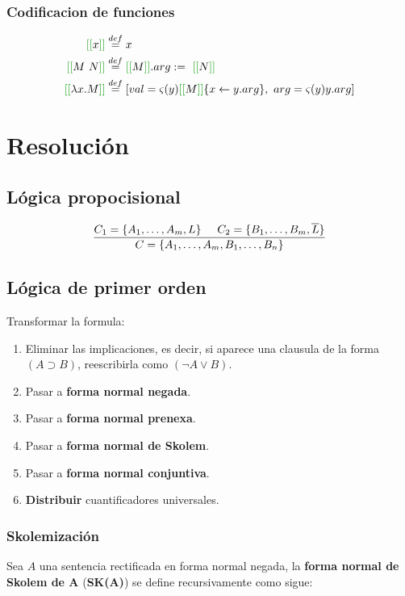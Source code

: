 \documentclass[10pt,a4paper]{article}
\begin{document}
\subsubsection{Codificacion de funciones}
\begin{align*}
\OORep{x} &\equalDef x\\
\OORep{M~N} &\equalDef \OORep{M}.arg :=~\OORep{N}\\
\OORep{\lambdaAbsI{x}{M}} &\equalDef 
[\OOAtributo{val}{y}{\OORep{M}\{x\leftarrow y.arg\}},~\OOAtributo{arg}{y}{y.arg}]\\
\end{align*}


\newpage
\section{Resolución}
\subsection{Lógica propocisional}
$$\frac{C_1 = \{A_1,\dots,A_m,L\}\hspace*{5mm} C_2 = \{B_1,\dots,B_m, \overline{L}\}}{C = \{A_1,\dots,A_m, B_1,\dots,B_n\}}$$

\subsection{Lógica de primer orden}
Transformar la formula:
\begin{enumerate}
\item Eliminar las implicaciones, es decir, si aparece una clausula de la forma $(A\supset B)$, reescribirla como $(\lnot A \lor B)$.
\item Pasar a \textbf{forma normal negada}.
\item Pasar a \textbf{forma normal prenexa}.
\item Pasar a \textbf{forma normal de Skolem}.
\item Pasar a \textbf{forma normal conjuntiva}.
\item \textbf{Distribuir} cuantificadores universales.
\end{enumerate}

\subsubsection{Skolemización}

Sea $A$ una sentencia rectificada en forma normal negada, la \textbf{forma normal de Skolem de A} (\textbf{SK(A)}) se define recursivamente como sigue:
\end{document}
